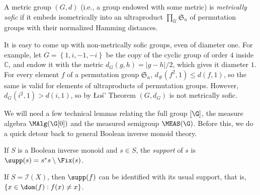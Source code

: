 \begin{definition}
A metric group $(G,d)$ (i.e., a group endowed with some metric) is \emph{metrically sofic} if it embeds isometrically into an ultraproduct $\prod_\mathcal{U}\mathfrak{S}_n$ of permutation groups with their normalized Hamming distances.
\end{definition}

\begin{example}
It is easy to come up with non-metrically sofic groups, even of diameter one. For example, let $G=\left\{1,i,-1,-i\right\}$ be the copy of the cyclic group of order $4$ inside $\mathbb{C}$, and endow it with the metric $d_G(g,h)=|g-h|/2$, which gives it diameter $1$. For every element $f$ of a permutation group $\mathfrak{S}_n$, $d_\#(f^2,1)\leq d(f,1)$, so the same is valid for elements of ultraproducts of permutation groups. However, $d_G(i^2,1)>d(i,1)$, so by \L o\'{s}' Theorem $(G,d_G)$ is not metrically sofic.
\end{example}

We will need a few technical lemmas relating the full group $[\G]$, the measure algebra $\MAlg(\G[0])$ and the measured semigroup $\MEAS(\G)$. Before this, we do a quick detour back to general Boolean inverse monoid theory.

\begin{definition}
If $S$ is a Boolean inverse monoid and $s\in S$, the \emph{support} of $s$ is $\supp(s)=s^*s\setminus\Fix(s)$.
\end{definition}

\begin{example}
If $S=\mathcal{I}(X)$, then $\supp(f)$ can be identified with its usual support, that is, $\left\{x\in\dom(f):f(x)\neq x\right\}$.
\end{example}

